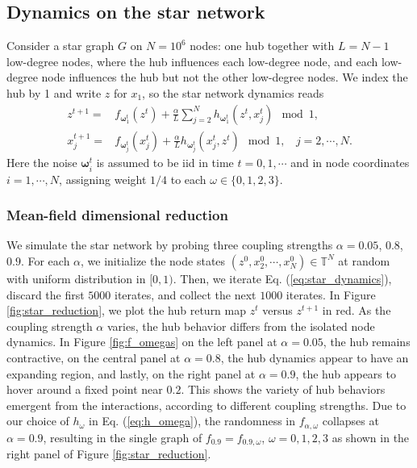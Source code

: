 \documentclass[a4paper]{article}
\theoremstyle{plain}
\theoremstyle{definition}
\newcommand{\T}{\mathbb{T}}
\begin{document}
\subsection{Dynamics on the star network}\label{sec:intro_star}
Consider a star graph $G$ on $N=10^6$ nodes: one hub together with $L=N-1$ low-degree nodes, where the hub influences each low-degree node, and each low-degree node influences the hub but not the other low-degree nodes. %
We index the hub by 1 and write $z$ for $x_1$, so the star network dynamics reads
\begin{equation}\label{eq:star_dynamics}
	\begin{aligned}
		z^{t+1} =& f_{\boldsymbol{\omega}_1^t}(z^t) + \frac{\alpha}{L} \sum_{j=2}^N h_{\boldsymbol{\omega}_1^t} (z^t,x_j^t)\mod1,\\
		x_j^{t+1} =& f_{\boldsymbol{\omega}_j^t}(x_j^t) + \frac{\alpha}{L} h_{\boldsymbol{\omega}_j^t}(x_j^t, z^t)\mod1,~~~~j=2,\cdots,N.
	\end{aligned}
\end{equation}
Here the noise $\boldsymbol{\omega}_i^t$ is assumed to be iid in time $t=0,1,\cdots$ and in node coordinates $i=1,\cdots,N$, assigning weight $1/4$ to each $\omega\in\{0,1,2,3\}$.



\subsubsection{Mean-field dimensional reduction} \label{mfs}
We simulate the star network by probing three coupling strengths $\alpha=0.05$, $0.8$, $0.9$. For each $\alpha$, we initialize the node states $(z^0,x_2^0,\cdots,x_N^0)\in \T^N$ at random with uniform distribution in $[0,1)$. Then, we iterate Eq. (\ref{eq:star_dynamics}), discard the first $5000$ iterates, and collect the next $1000$ iterates. In Figure \ref{fig:star_reduction}, we plot the hub return map
$z^t$ versus $z^{t+1}$ in red.  As the coupling strength $\alpha$ varies, the hub behavior differs from the isolated node dynamics. In Figure \ref{fig:f_omegas} on the left panel at $\alpha=0.05$, the hub remains contractive, on the central panel at $\alpha=0.8$, the hub dynamics appear to have an expanding region, and lastly, on the right panel at $\alpha=0.9$, the hub appears to hover around a fixed point near $0.2$. This shows the variety of hub behaviors emergent from the interactions, according to different coupling strengths. Due to  our choice of $h_{\omega}$ in Eq. (\ref{eq:h_omega}), the randomness in $f_{\alpha,\omega}$ collapses at $\alpha=0.9$, resulting in the single graph of $f_{0.9}=f_{0.9,\omega}$, $\omega=0,1,2,3$ as shown in the right panel of Figure \ref{fig:star_reduction}.
\end{document}
